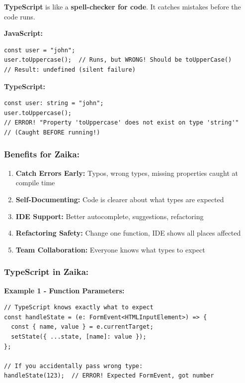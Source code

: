 \documentclass[12pt]{article}
\begin{document}
\textbf{TypeScript} is like a \textbf{spell-checker for code}. It catches mistakes before the code runs.

\textbf{JavaScript:}
\begin{lstlisting}
const user = "john";
user.toUppercase();  // Runs, but WRONG! Should be toUpperCase()
// Result: undefined (silent failure)
\end{lstlisting}

\textbf{TypeScript:}
\begin{lstlisting}
const user: string = "john";
user.toUppercase();  
// ERROR! "Property 'toUppercase' does not exist on type 'string'"
// (Caught BEFORE running!)
\end{lstlisting}

\subsubsection*{Benefits for Zaika:}

\begin{enumerate}
    \item \textbf{Catch Errors Early:} Typos, wrong types, missing properties caught at compile time
    \item \textbf{Self-Documenting:} Code is clearer about what types are expected
    \item \textbf{IDE Support:} Better autocomplete, suggestions, refactoring
    \item \textbf{Refactoring Safety:} Change one function, IDE shows all places affected
    \item \textbf{Team Collaboration:} Everyone knows what types to expect
\end{enumerate}

\subsubsection*{TypeScript in Zaika:}

\textbf{Example 1 - Function Parameters:}

\begin{lstlisting}
// TypeScript knows exactly what to expect
const handleState = (e: FormEvent<HTMLInputElement>) => {
  const { name, value } = e.currentTarget;
  setState({ ...state, [name]: value });
};

// If you accidentally pass wrong type:
handleState(123);  // ERROR! Expected FormEvent, got number
\end{lstlisting}
\end{document}
